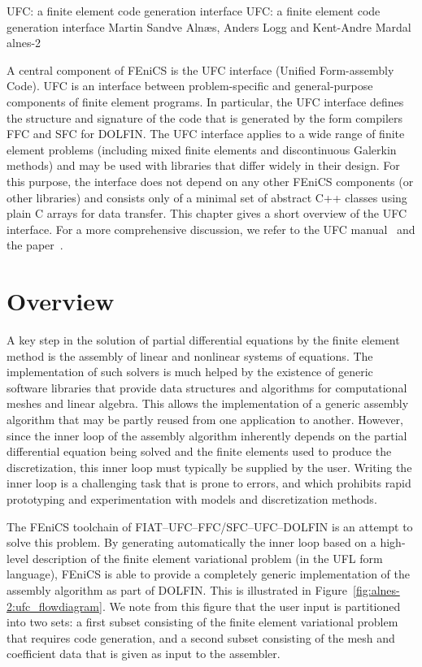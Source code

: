               {UFC: a finite element code generation interface}
              {UFC: a finite element code generation interface}
              {Martin Sandve Aln\ae{}s, Anders Logg and Kent-Andre Mardal}
              {alnes-2}

A central component of FEniCS is the UFC interface (Unified
Form-assembly Code). UFC is an interface between problem-specific and
general-purpose components of finite element programs. In particular,
the UFC interface defines the structure and signature of the code that
is generated by the form compilers FFC and SFC for DOLFIN.
The UFC interface applies to a wide range of finite element problems
(including mixed finite elements and discontinuous Galerkin methods)
and may be used with libraries that differ widely in their design. For
this purpose, the interface does not depend on any other FEniCS
components (or other libraries) and consists only of a minimal set of
abstract C++ classes using plain C arrays for data transfer.
This chapter gives a short overview of the UFC interface. For a more
comprehensive discussion, we refer to the UFC
manual~\citep{AlnaesLangtangenEtAl2007} and the
paper~\citet{AlnaesLoggMardalEtAl2009}.

\section{Overview}
\label{sec:alnes-2overview}

A key step in the solution of partial differential equations by the
finite element method is the assembly of linear and nonlinear systems
of equations. The implementation of such solvers is much helped by the
existence of generic software libraries that provide data structures
and algorithms for computational meshes and linear algebra. This
allows the implementation of a generic assembly algorithm that may be
partly reused from one application to another. However, since the
inner loop of the assembly algorithm inherently depends on the partial
differential equation being solved and the finite elements used to
produce the discretization, this inner loop must typically be supplied
by the user. Writing the inner loop is a challenging task that is
prone to errors, and which prohibits rapid prototyping and
experimentation with models and discretization methods.

The FEniCS toolchain of FIAT--UFC--FFC/SFC--UFC--DOLFIN is an attempt
to solve this problem. By generating automatically the inner loop
based on a high-level description of the finite element variational
problem (in the UFL form language), FEniCS is able to provide a
completely generic implementation of the assembly algorithm as part of
DOLFIN. This is illustrated in
Figure~\ref{fig:alnes-2:ufc_flowdiagram}. We note from this figure
that the user input is partitioned into two sets: a first subset
consisting of the finite element variational problem that requires
code generation, and a second subset consisting of the mesh and
coefficient data that is given as input to the assembler.

